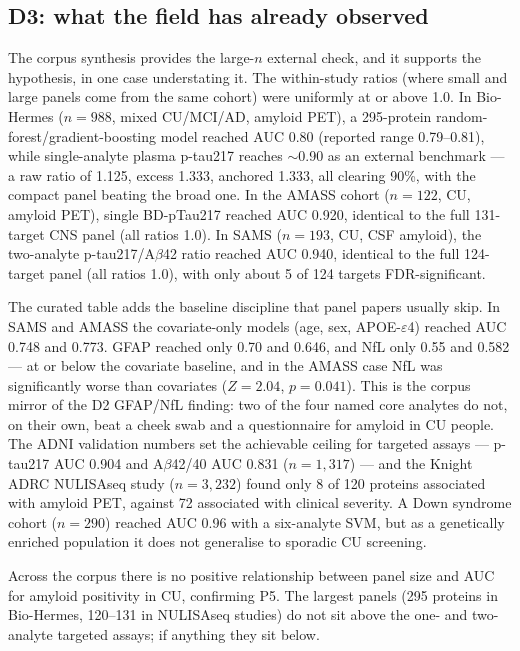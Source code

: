 \documentclass{article}
\begin{document}
\subsection{D3: what the field has already observed}

The corpus synthesis provides the large-$n$ external check, and it supports the
hypothesis, in one case understating it. The within-study ratios (where small
and large panels come from the same cohort) were uniformly at or above 1.0. In
Bio-Hermes ($n=988$, mixed CU/MCI/AD, amyloid PET), a 295-protein
random-forest/gradient-boosting model reached AUC 0.80 (reported range
0.79--0.81), while single-analyte plasma p-tau217 reaches $\sim$0.90 as an
external benchmark --- a raw ratio of 1.125, excess 1.333, anchored 1.333, all
clearing 90\%, with the compact panel beating the broad one. In the AMASS
cohort ($n=122$, CU, amyloid PET), single BD-pTau217 reached AUC 0.920,
identical to the full 131-target CNS panel (all ratios 1.0). In SAMS ($n=193$,
CU, CSF amyloid), the two-analyte p-tau217/A$\beta$42 ratio reached AUC 0.940,
identical to the full 124-target panel (all ratios 1.0), with only about 5 of
124 targets FDR-significant.

The curated table adds the baseline discipline that panel papers usually skip.
In SAMS and AMASS the covariate-only models (age, sex, APOE-$\varepsilon$4)
reached AUC 0.748 and 0.773. GFAP reached only 0.70 and 0.646, and NfL only
0.55 and 0.582 --- at or below the covariate baseline, and in the AMASS case
NfL was significantly worse than covariates ($Z=2.04$, $p=0.041$). This is the
corpus mirror of the D2 GFAP/NfL finding: two of the four named core analytes
do not, on their own, beat a cheek swab and a questionnaire for amyloid in CU
people. The ADNI validation numbers set the achievable ceiling for targeted
assays --- p-tau217 AUC 0.904 and A$\beta$42/40 AUC 0.831 ($n=1{,}317$) --- and
the Knight ADRC NULISAseq study ($n=3{,}232$) found only 8 of 120 proteins
associated with amyloid PET, against 72 associated with clinical severity. A
Down syndrome cohort ($n=290$) reached AUC 0.96 with a six-analyte SVM, but as a
genetically enriched population it does not generalise to sporadic CU screening.

Across the corpus there is no positive relationship between panel size and AUC
for amyloid positivity in CU, confirming P5. The largest panels (295 proteins
in Bio-Hermes, 120--131 in NULISAseq studies) do not sit above the one- and
two-analyte targeted assays; if anything they sit below.
\end{document}
